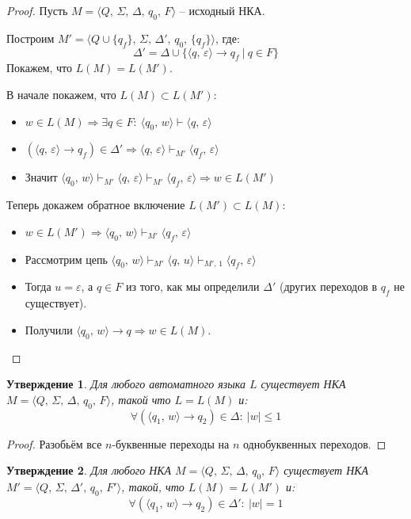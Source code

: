 \documentclass[a4paper,12pt]{article}
\renewcommand{\leq}{\ensuremath{\leqslant}}
\theoremstyle{plain}
\newtheorem{proposition}{Утверждение}[subsection]
\theoremstyle{definition}
\theoremstyle{remark}
\begin{document}
\begin{proof}
	Пусть $M = \langle Q,\,\Sigma,\, \Delta,\, q_0,\, F \rangle$ -- исходный НКА.

	Построим $M' = \langle Q \cup \{q_f\},\,\Sigma,\, \Delta',\, q_0,\, \{q_f\} \rangle$, где:
	\[
		\Delta' = \Delta \cup \{\langle q,\, \varepsilon\rangle \to q_f \:|\: q \in F\}
	\]
	Покажем, что $L(M) = L(M')$.

	В начале покажем, что $L(M) \subset L(M')$:
	\begin{itemize}
		\item $w \in L(M) \Rightarrow \exists q \in F:\: \langle q_0,\, w\rangle \vdash \langle q,\, \varepsilon\rangle$
		\item $(\langle q,\, \varepsilon\rangle \to q_f) \in \Delta' \Rightarrow \langle q,\, \varepsilon\rangle \vdash_{M'} \langle q_f,\, \varepsilon\rangle$
		\item Значит $\langle q_0,\, w\rangle \vdash_{M'} \langle q,\, \varepsilon\rangle \vdash_{M'} \langle q_f,\, \varepsilon\rangle \Rightarrow w \in L(M')$
	\end{itemize}
	Теперь докажем обратное включение $L(M') \subset L(M)$:
	\begin{itemize}
		\item $w \in L(M') \Rightarrow \langle q_0,\, w\rangle \vdash_{M'} \langle q_f,\, \varepsilon\rangle$
		\item Рассмотрим цепь $\langle q_0,\, w\rangle \vdash_{M'} \langle q,\, u\rangle \vdash_{M',\, 1} \langle q_f,\, \varepsilon\rangle$
		\item Тогда $u = \varepsilon$, а $q \in F$ из того, как мы определили $\Delta'$ (других переходов в $q_f$ не существует).
		\item Получили $\langle q_0,\, w\rangle \to q \Rightarrow w \in L(M)$.
	\end{itemize}
\end{proof}

\begin{proposition}
	Для любого автоматного языка $L$ существует НКА $M = \langle Q,\,\Sigma,\, \Delta,\, q_0,\, F \rangle$, такой что $L = L(M)$ и:
	\[
		\forall (\langle q_1,\, w\rangle \to q_2) \in \Delta :\: |w| \leq 1
	\]
\end{proposition}

\begin{proof}
	Разобьём все $n$-буквенные переходы на $n$ однобуквенных переходов.
\end{proof}

\begin{proposition}
	Для любого НКА $M = \langle Q,\,\Sigma,\, \Delta,\, q_0,\, F \rangle$ существует НКА $M' = \langle Q,\,\Sigma,\, \Delta',\, q_0,\, F' \rangle$, такой, что $L(M) = L(M')$ и:
	\[
		\forall (\langle q_1,\, w\rangle \to q_2) \in \Delta' :\: |w| = 1
	\]
\end{proposition}
\end{document}
